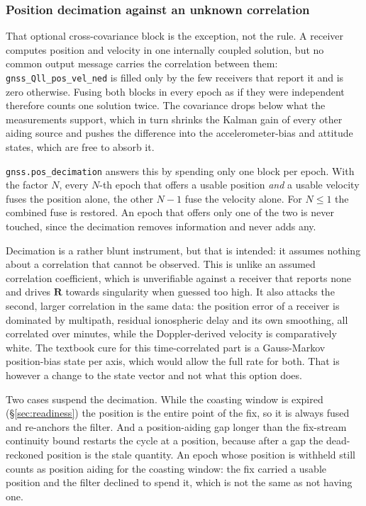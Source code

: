 \documentclass[11pt,a4paper]{article}
\newcommand{\mat}[1]{\bm{#1}}
\newcommand{\code}[1]{\texttt{#1}}
\begin{document}
\subsubsection{Position decimation against an unknown correlation}
\label{sec:gnss-pos-decimation}

That optional cross-covariance block is the exception, not the rule. A
receiver computes position and velocity in one internally coupled
solution, but no common output message carries the correlation between
them: \code{gnss\_\allowbreak{}Qll\_\allowbreak{}pos\_\allowbreak{}vel\_\allowbreak{}ned} is filled only by the few receivers
that report it and is zero otherwise. Fusing both blocks in every epoch as
if they were independent therefore counts one solution twice. The
covariance drops below what the measurements support, which in turn
shrinks the Kalman gain of every other aiding source and pushes the
difference into the accelerometer-bias and attitude states, which are free
to absorb it.

\code{gnss.pos\_\allowbreak{}decimation} answers this by spending only one block per
epoch. With the factor $N$, every $N$-th epoch that offers a usable
position \emph{and} a usable velocity fuses the position alone, the other
$N-1$ fuse the velocity alone. For $N \le 1$ the combined fuse is restored. An
epoch that offers only one of the two is never touched, since the decimation
removes information and never adds any.

Decimation is a rather blunt instrument, but that is intended: it assumes nothing about a
correlation that cannot be observed. This is unlike an assumed correlation
coefficient, which is unverifiable against a receiver that reports none and
drives $\mat{R}$ towards singularity when guessed too high. It also attacks the
second, larger correlation in the same data: the position error of a receiver is
dominated by multipath, residual ionospheric delay and its own smoothing, all
correlated over minutes, while the Doppler-derived velocity is comparatively
white. The textbook cure for this time-correlated part is a Gauss-Markov
position-bias state per axis, which would allow the full rate for both. That is
however a change to the state vector and not what this option does.

Two cases suspend the decimation. While the coasting window is expired
(\S\ref{sec:readiness}) the position is the entire point of the fix,
so it is always fused and re-anchors the filter. And a position-aiding
gap longer than the fix-stream continuity bound restarts the cycle at a
position, because after a gap the dead-reckoned position is the stale
quantity. An epoch whose position is withheld still counts as position
aiding for the coasting window: the fix carried a usable position and the
filter declined to spend it, which is not the same as not having one.
\end{document}
